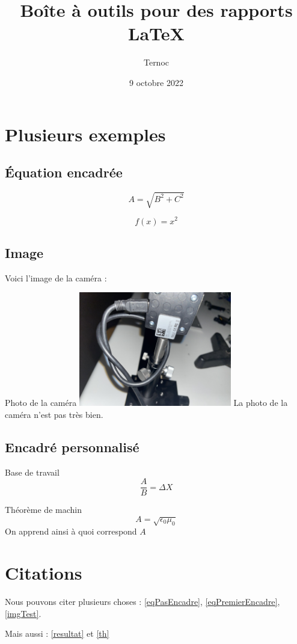 \documentclass[twoside, a4paper, titlepage]{article}
\title{Boîte à outils pour des rapports LaTeX}
\author{Ternoc}
\date{9 octobre 2022}
\begin{document}
\maketitle
\tableofcontents
\newpage
   \section{Plusieurs exemples}      
      \subsection{Équation encadrée}
         \begin{equation} \label{eqPasEncadre}
            A=\sqrt{B^2+C^2}
         \end{equation}

         \begin{equationEncadree}[label=eqPremierEncadre]
            \[
               f(x) = x^2
            \]
         \end{equationEncadree}
      
      \subsection{Image}
      Voici l'image de la caméra :
      \begin{customFig}[label=imgTest]{Photo de la caméra}
         \includegraphics[height=5cm]{IMG_test.jpeg}
         \tcblower
         La photo de la caméra n'est pas très bien.
      \end{customFig}

      \subsection{Encadré personnalisé}
      \begin{resultat}[label=resultat]{Base de travail}
         \[
            \frac{A}{B}=\Delta X
         \]
      \end{resultat}

      \begin{theoremCustom}[label=th]{Théorème de machin}
         \[
            A=\sqrt{\epsilon_0 \mu_0}
         \]
         \tcblower
         On apprend ainsi à quoi correspond $A$
      \end{theoremCustom}
   
   \section{Citations}
   Nous pouvons citer plusieurs choses : \cref{eqPasEncadre}, \cref{eqPremierEncadre}, \cref{imgTest}.

   Mais aussi : \cref{resultat} et \cref{th}
\end{document}
